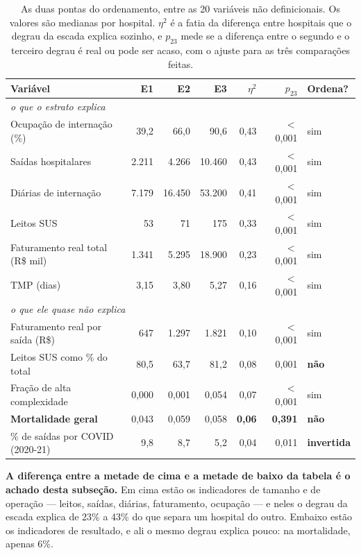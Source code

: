 \begin{table}[H]
\centering
\caption{As duas pontas do ordenamento, entre as 20 variáveis não
definicionais. Os valores são medianas por hospital. $\eta^2$ é a fatia da
diferença entre hospitais que o degrau da escada explica sozinho, e
$p_{23}$ mede se a diferença entre o segundo e o terceiro degrau é real ou
pode ser acaso, com o ajuste para as três comparações feitas.}
\label{tab:eta2estratos}
\small
\begin{tabular}{lrrrrrl}
\toprule
Variável & E1 & E2 & E3 & $\eta^2$ & $p_{23}$ & Ordena? \\
\midrule
\multicolumn{7}{l}{\emph{o que o estrato explica}}\\
Ocupação de internação (\%)      & 39,2 & 66,0 & 90,6 & 0,43 & $<$0,001 & sim \\
Saídas hospitalares              & 2.211 & 4.266 & 10.460 & 0,43 & $<$0,001 & sim \\
Diárias de internação            & 7.179 & 16.450 & 53.200 & 0,41 & $<$0,001 & sim \\
Leitos SUS                       & 53 & 71 & 175 & 0,33 & $<$0,001 & sim \\
Faturamento real total (R\$ mil) & 1.341 & 5.295 & 18.900 & 0,23 & $<$0,001 & sim \\
TMP (dias)                       & 3,15 & 3,80 & 5,27 & 0,16 & $<$0,001 & sim \\
\midrule
\multicolumn{7}{l}{\emph{o que ele quase não explica}}\\
Faturamento real por saída (R\$) & 647 & 1.297 & 1.821 & 0,10 & $<$0,001 & sim \\
Leitos SUS como \% do total      & 80,5 & 63,7 & 81,2 & 0,08 & 0,001 & \textbf{não} \\
Fração de alta complexidade      & 0,000 & 0,001 & 0,054 & 0,07 & $<$0,001 & sim \\
\textbf{Mortalidade geral}       & 0,043 & 0,059 & 0,058 & \textbf{0,06} & \textbf{0,391} & \textbf{não} \\
\% de saídas por COVID (2020-21) & 9,8 & 8,7 & 5,2 & 0,04 & 0,011 & \textbf{invertida} \\
\bottomrule
\end{tabular}
\end{table}

\textbf{A diferença entre a metade de cima e a metade de baixo da tabela é o
achado desta subseção.} Em cima estão os indicadores de tamanho e de
operação --- leitos, saídas, diárias, faturamento, ocupação --- e neles o
degrau da escada explica de 23\% a 43\% do que separa um hospital do outro.
Embaixo estão os indicadores de resultado, e ali o mesmo degrau explica
pouco: na mortalidade, apenas 6\%.

